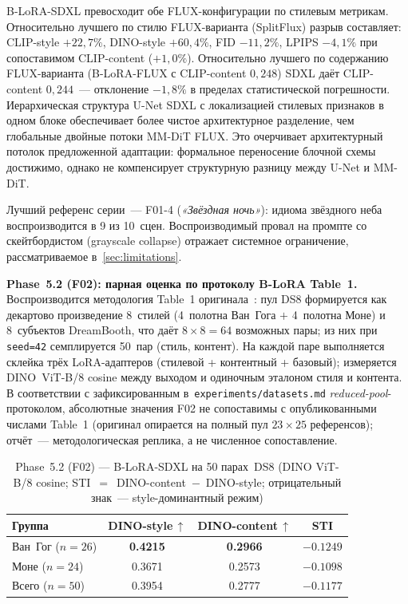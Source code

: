 B-LoRA-SDXL превосходит обе FLUX-конфигурации по стилевым метрикам. Относительно лучшего по стилю FLUX-варианта (SplitFlux) разрыв составляет: CLIP-style $+22{,}7\%$, DINO-style $+60{,}4\%$, FID $-11{,}2\%$, LPIPS $-4{,}1\%$ при сопоставимом CLIP-content ($+1{,}0\%$). Относительно лучшего по содержанию FLUX-варианта (B-LoRA-FLUX с CLIP-content $0{,}248$) SDXL даёт CLIP-content $0{,}244$~--- отклонение $-1{,}8\%$ в пределах статистической погрешности. Иерархическая структура U-Net SDXL с локализацией стилевых признаков в одном блоке обеспечивает более чистое архитектурное разделение, чем глобальные двойные потоки MM-DiT FLUX. Это очерчивает архитектурный потолок предложенной адаптации: формальное переносение блочной схемы достижимо, однако не компенсирует структурную разницу между U-Net и MM-DiT.

Лучший референс серии~--- F01-4 (\textit{«Звёздная ночь»}): идиома звёздного неба воспроизводится в 9 из 10~сцен. Воспроизводимый провал на промпте со скейтбордистом (grayscale collapse) отражает системное ограничение, рассматриваемое в~\ref{sec:limitations}.

\textbf{Phase~5.2 (F02): парная оценка по протоколу B-LoRA Table~1.} Воспроизводится методология Table~1 оригинала~\cite{frenkel2024blora}: пул DS8 формируется как декартово произведение 8~стилей (4~полотна Ван~Гога $+$ 4~полотна Моне) и 8~субъектов DreamBooth, что даёт $8\times8=64$ возможных пары; из них при \texttt{seed=42} семплируется 50~пар (стиль, контент). На каждой паре выполняется склейка трёх LoRA-адаптеров (стилевой + контентный + базовый); измеряется DINO~ViT-B/8 cosine между выходом и одиночным эталоном стиля и контента. В соответствии с зафиксированным в~\texttt{experiments/datasets.md} \emph{reduced-pool}-протоколом, абсолютные значения F02 не сопоставимы с опубликованными числами Table~1 (оригинал опирается на полный пул $23 \times 25$ референсов); отчёт~--- методологическая реплика, а не численное сопоставление.

\begin{table}[h]
\centering
\caption{Phase~5.2 (F02) --- B-LoRA-SDXL на 50 парах~DS8 (DINO ViT-B/8 cosine; STI~$=$~DINO-content~$-$~DINO-style; отрицательный знак~--- style-доминантный режим)}
\label{tab:phase5_2_summary}
\begingroup\small
\begin{tabular}{lccc}
\hline
\textbf{Группа}                 & \textbf{DINO-style\,$\uparrow$} & \textbf{DINO-content\,$\uparrow$} & \textbf{STI} \\
\hline
Ван~Гог ($n=26$)                & \textbf{0.4215} & \textbf{0.2966} & $-0.1249$ \\
Моне ($n=24$)                   & 0.3671          & 0.2573          & $-0.1098$ \\
Всего ($n=50$)                  & 0.3954          & 0.2777          & $\mathbf{-0.1177}$ \\
\hline
\end{tabular}\endgroup
\end{table}

